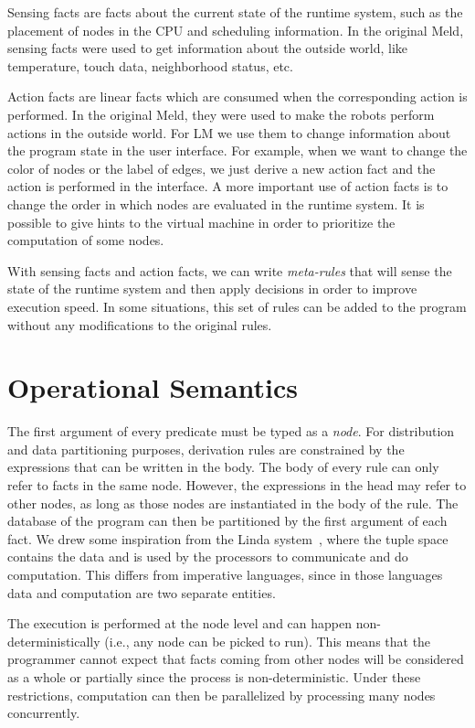 Sensing facts are facts about the current state of the runtime system, such as the placement
of nodes in the CPU and scheduling information. In the original Meld, sensing facts
were used to get information about the outside world, like temperature, touch data,
neighborhood status, etc.

Action facts are linear facts which are consumed when the corresponding action is performed.
In the original Meld, they were used to make the robots perform actions in the outside world.
For LM we use them to change information about the program state
in the user interface. For example, when we want to change the color of nodes or the label
of edges, we just derive a new action fact and the action is performed in the interface.
A more important use of action facts is to change the order in which nodes
are evaluated in the runtime system. It is possible to give hints to the virtual
machine in order to prioritize the computation of some nodes.

With sensing facts and action facts, we can write \emph{meta-rules} that will sense the
state of the runtime system and then apply decisions in order to improve execution speed.
In some situations, this set of rules can be added to the program without any modifications
to the original rules.

\section{Operational Semantics}

The first argument of every predicate must be typed as a \emph{node}.
For distribution and data partitioning purposes, derivation rules are constrained by the expressions that can be written in the body.
The body of every rule can only refer to facts in the same node.
However, the expressions in the head may refer to other nodes, as long as those nodes are instantiated in the body of the rule.
The database of the program can then be partitioned by the first argument of each fact. 
We drew some inspiration from the Linda system~\cite{1663305}, where the tuple space contains the data and is used by the processors
to communicate and do computation.
This differs from imperative languages, since in those languages data and computation are two separate entities.

The execution is performed at the node level and can happen non-deterministically (i.e., any node can
be picked to run). This means that the programmer cannot expect
that facts coming from other nodes will be considered as a whole or partially since the process is non-deterministic.
Under these restrictions, computation can then be parallelized by processing many nodes concurrently.

